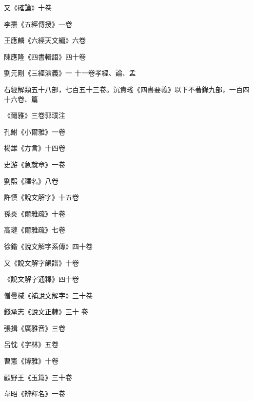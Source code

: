 \begin{pinyinscope}
 又《確論》十卷



 李燾《五經傳授》一卷



 王應麟《六經天文編》六卷



 陳應隆《四書輯語》四十卷



 劉元剛《三經演義》一
 十一卷孝經、論、孟



 右經解類五十八部，七百五十三卷。沉貴瑤《四書要義》以下不著錄九部，一百四十六卷、篇



 《爾雅》三卷郭璞注



 孔鮒《小爾雅》一卷



 楊雄《方言》十四卷



 史游《急就章》一卷



 劉熙《釋名》八卷



 許慎《說文解字》十五卷



 孫炎《爾雅疏》十卷



 高璉《爾雅疏》七卷



 徐鍇《說文解字系傳》四十卷



 又《說文解字韻譜》十卷



 《說文解字通釋》四十卷



 僧曇棫《補說文解字》三十卷



 錢承志《說文正隸》三十
 卷



 張揖《廣雅音》三卷



 呂忱《字林》五卷



 曹憲《博雅》十卷



 顧野王《玉篇》三十卷



 韋昭《辨釋名》一卷




\end{pinyinscope}
